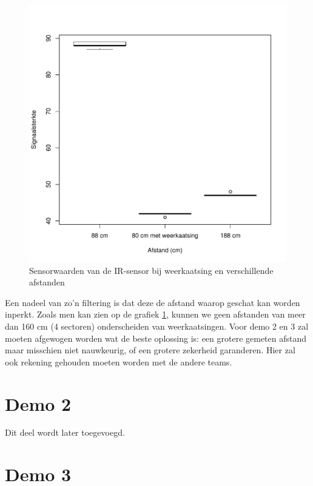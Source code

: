 \documentclass[12pt,a4paper]{report}
\begin{document}
\begin{figure}
\begin{center}

 \includegraphics{./resources/boxplotSpiegeling.pdf}
 \caption{Sensorwaarden van de IR-sensor bij weerkaatsing en verschillende afstanden 
\label{fig:boxplotSpiegeling}}

\end{center}
\end{figure}

Een nadeel van zo'n filtering is dat deze de afstand waarop geschat kan worden inperkt. Zoals men kan zien op de grafiek \ref{fig:boxplotSpiegeling}, kunnen we geen afstanden van meer dan 160 cm (4 sectoren) onderscheiden van weerkaatsingen. Voor demo 2 en 3 zal moeten afgewogen worden wat de beste oplossing is: een grotere gemeten afstand maar misschien niet nauwkeurig, of een grotere zekerheid garanderen. Hier zal ook rekening gehouden moeten worden met de andere teams. 

\section{Demo 2}

Dit deel wordt later toegevoegd.

\section{Demo 3}
\end{document}
